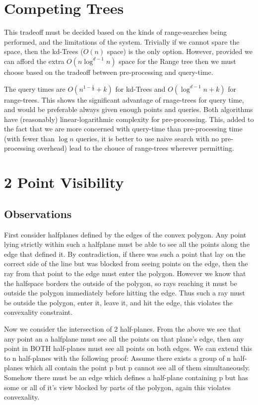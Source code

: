 \section {Competing Trees}
This tradeoff must be decided based on the kinds of range-searches being performed, and the limitations of the system.
Trivially if we cannot spare the space, then the kd-Trees ($O(n)$ space) is the only option.
However, provided we can afford the extra $O(n\log^{d-1}n)$ space for the Range tree then we must choose based on the tradeoff between pre-processing and query-time.

The query times are $O(n^{1-\frac{1}{d}} + k)$ for kd-Trees and $O(\log^{d-1}n+k)$ for range-trees.
This shows the significant advantage of rnage-trees for query time, and would be preferable always given enough points and queries.
Both algorithms have (reasonably) linear-logarithmic complexity for pre-processing.
This, added to the fact that we are more concerned with query-time than pre-processing time (with fewer than $\log n$ queries, it is better to use naive search with no pre-processing overhead) lead to the chouce of range-trees wherever permitting.

\section {2 Point Visibility}
\subsection{Observations}
First consider halfplanes defined by the edges of the convex polygon.
Any point lying strictly within such a halfplane must be able to see all the points along the edge that defined it.
By contradiction, if there was such a point that lay on the correct side of the line but was blocked from seeing points on the edge, then the ray from that point to the edge must enter the polygon.
However we know that the halfspace borders the outside of the polygon, so rays reaching it must be outside the polygon immediately before hitting the edge.
Thus such a ray must be outside the polygon, enter it, leave it, and hit the edge, this violates the convexality constraint.

Now we consider the intersection of 2 half-planes.
From the above we see that any point an a halfplane must see all the points on that plane's edge, then any point in BOTH half-planes must see all points on both edges.
We can extend this to n half-planes with the following proof:
Assume there exists a group of n half-planes which all contain the point p but p cannot see all of them simultaneously.
Somehow there must be an edge which defines a half-plane containing p but has some or all of it's view blocked by parts of the polygon, again this violates convexality.

